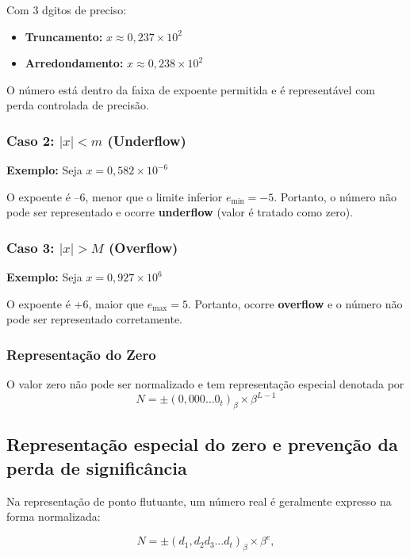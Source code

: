 Com 3 dgitos de preciso:

\begin{itemize}
  \item \textbf{Truncamento:} \( x \approx 0{,}237 \times 10^2 \)
  \item \textbf{Arredondamento:} \( x \approx 0{,}238 \times 10^2 \)
\end{itemize}

O número está dentro da faixa de expoente permitida e é representável com perda controlada de precisão.

\subsubsection*{Caso 2: \( |x| < m \) (Underflow)}

\textbf{Exemplo:} Seja \( x = 0{,}582 \times 10^{-6} \)

O expoente é \(–6\), menor que o limite inferior \( e_{\text{min}} = -5 \).  
Portanto, o número não pode ser representado e ocorre \textbf{underflow} (valor é tratado como zero).

\subsubsection*{Caso 3: \( |x| > M \) (Overflow)}

\textbf{Exemplo:} Seja \( x = 0{,}927 \times 10^6 \)

O expoente é +6, maior que \( e_{\text{max}} = 5 \).  
Portanto, ocorre \textbf{overflow} e o número não pode ser representado corretamente.


\subsubsection*{Representação do Zero}

O valor zero não pode ser normalizado e tem representação especial denotada por
\[
N = \pm (0{,}000\ldots 0_{t})_\beta \times \beta^{L - 1}
\]

\subsection*{Representação especial do zero e prevenção da perda de significância}

Na representação de ponto flutuante, um número real é geralmente expresso na forma normalizada:

\[
N = \pm (d_1{,}d_2 d_3 \ldots d_t)_\beta \times \beta^{e},
\]

